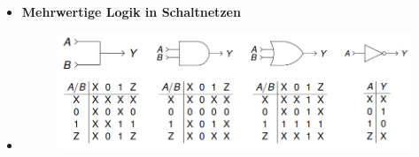\documentclass[11pt,a4paper]{article}
\begin{document}
\begin{itemize}
\item \textbf{Mehrwertige Logik in Schaltnetzen}
\item[] \begin{figure}[H]
				\begin{center}
				\includegraphics[height=3.5cm]{mehrTabelle}
				\end{center}
			\end{figure}


\end{itemize}
\end{document}
